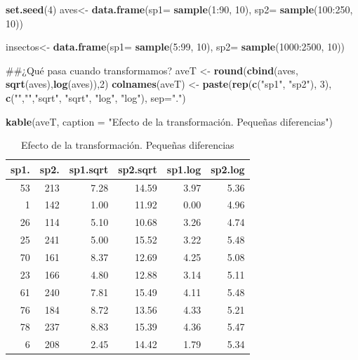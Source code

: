 \documentclass[]{book}
\newenvironment{Shaded}{\begin{snugshade}}{\end{snugshade}}
\newcommand{\KeywordTok}[1]{\textcolor[rgb]{0.13,0.29,0.53}{\textbf{{#1}}}}
\newcommand{\DataTypeTok}[1]{\textcolor[rgb]{0.13,0.29,0.53}{{#1}}}
\newcommand{\DecValTok}[1]{\textcolor[rgb]{0.00,0.00,0.81}{{#1}}}
\newcommand{\StringTok}[1]{\textcolor[rgb]{0.31,0.60,0.02}{{#1}}}
\newcommand{\NormalTok}[1]{{#1}}
\begin{document}
\begin{Shaded}
\begin{Highlighting}[]
\KeywordTok{set.seed}\NormalTok{(}\DecValTok{4}\NormalTok{)}
\NormalTok{aves<-}\StringTok{ }\KeywordTok{data.frame}\NormalTok{(}\DataTypeTok{sp1=} \KeywordTok{sample}\NormalTok{(}\DecValTok{1}\NormalTok{:}\DecValTok{90}\NormalTok{, }\DecValTok{10}\NormalTok{), }\DataTypeTok{sp2=} \KeywordTok{sample}\NormalTok{(}\DecValTok{100}\NormalTok{:}\DecValTok{250}\NormalTok{, }\DecValTok{10}\NormalTok{))}

\NormalTok{insectos<-}\StringTok{ }\KeywordTok{data.frame}\NormalTok{(}\DataTypeTok{sp1=} \KeywordTok{sample}\NormalTok{(}\DecValTok{5}\NormalTok{:}\DecValTok{99}\NormalTok{, }\DecValTok{10}\NormalTok{), }\DataTypeTok{sp2=} \KeywordTok{sample}\NormalTok{(}\DecValTok{1000}\NormalTok{:}\DecValTok{2500}\NormalTok{, }\DecValTok{10}\NormalTok{))}

\NormalTok{##¿Qué pasa cuando transformamos?}
\NormalTok{aveT <-}\StringTok{ }\KeywordTok{round}\NormalTok{(}\KeywordTok{cbind}\NormalTok{(aves, }\KeywordTok{sqrt}\NormalTok{(aves),}\KeywordTok{log}\NormalTok{(aves)),}\DecValTok{2}\NormalTok{)}
\KeywordTok{colnames}\NormalTok{(aveT) <-}\StringTok{ }\KeywordTok{paste}\NormalTok{(}\KeywordTok{rep}\NormalTok{(}\KeywordTok{c}\NormalTok{(}\StringTok{"sp1"}\NormalTok{, }\StringTok{"sp2"}\NormalTok{), }\DecValTok{3}\NormalTok{), }\KeywordTok{c}\NormalTok{(}\StringTok{""}\NormalTok{,}\StringTok{""}\NormalTok{,}\StringTok{"sqrt"}\NormalTok{, }\StringTok{"sqrt"}\NormalTok{, }\StringTok{"log"}\NormalTok{, }\StringTok{"log"}\NormalTok{), }\DataTypeTok{sep=}\StringTok{"."}\NormalTok{)}

\KeywordTok{kable}\NormalTok{(aveT, }\DataTypeTok{caption =} \StringTok{"Efecto de la transformación. Pequeñas diferencias"}\NormalTok{)}
\end{Highlighting}
\end{Shaded}

\begin{table}

\caption{\label{tab:unnamed-chunk-16}Efecto de la transformación. Pequeñas diferencias}
\centering
\begin{tabular}[t]{r|r|r|r|r|r}
\hline
sp1. & sp2. & sp1.sqrt & sp2.sqrt & sp1.log & sp2.log\\
\hline
53 & 213 & 7.28 & 14.59 & 3.97 & 5.36\\
\hline
1 & 142 & 1.00 & 11.92 & 0.00 & 4.96\\
\hline
26 & 114 & 5.10 & 10.68 & 3.26 & 4.74\\
\hline
25 & 241 & 5.00 & 15.52 & 3.22 & 5.48\\
\hline
70 & 161 & 8.37 & 12.69 & 4.25 & 5.08\\
\hline
23 & 166 & 4.80 & 12.88 & 3.14 & 5.11\\
\hline
61 & 240 & 7.81 & 15.49 & 4.11 & 5.48\\
\hline
76 & 184 & 8.72 & 13.56 & 4.33 & 5.21\\
\hline
78 & 237 & 8.83 & 15.39 & 4.36 & 5.47\\
\hline
6 & 208 & 2.45 & 14.42 & 1.79 & 5.34\\
\hline
\end{tabular}
\end{table}
\end{document}
